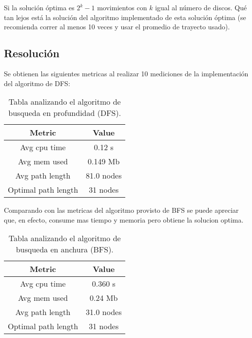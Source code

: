 \documentclass[12pt]{article}
\begin{document}
Si la solución óptima es $2^k - 1$ movimientos con $k$ igual al número de discos. Qué tan lejos está la solución 
del algoritmo implementado de esta solución óptima (se recomienda correr al menos 10 veces y usar el promedio de 
trayecto usado).

\subsection*{Resolución}

\vspace{0.1in}
Se obtienen las siguientes metricas al realizar 10 mediciones de la implementación del algoritmo de DFS: \\
\begin{table}[h]
  \caption{Tabla analizando el algoritmo de busqueda en profundidad (DFS).}
  \begin{tabular}{|c|c|}
    Metric & Value \\
    \hline
    Avg cpu time & 0.12 s \\
    Avg mem used & 0.149 Mb \\
    Avg path length & 81.0 nodes \\
    Optimal path length & 31 nodes \\
   \end{tabular}
\end{table}

Comparando con las metricas del algoritmo provisto de BFS se puede apreciar que, en efecto, consume mas tiempo y memoria pero obtiene la solucion optima.

\begin{table}[h]
  \caption{Tabla analizando el algoritmo de busqueda en anchura (BFS).}
  \begin{tabular}{|c|c|}
    Metric & Value \\
    \hline
    Avg cpu time & 0.360 s \\
    Avg mem used & 0.24 Mb \\
    Avg path length & 31.0 nodes \\
    Optimal path length & 31 nodes \\
  \end{tabular}
\end{table}

\newpage
\end{document}
